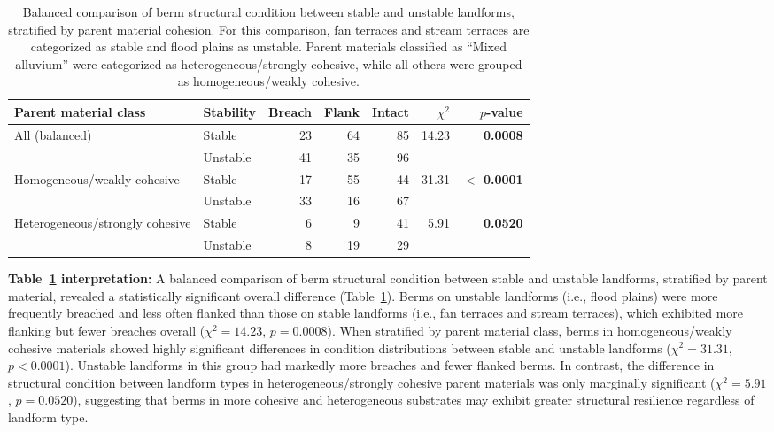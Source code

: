 \documentclass[review]{elsarticle}
\begin{document}
\begin{table}[h!]
\centering
\caption{\normalsize Balanced comparison of berm structural condition between stable and unstable landforms, stratified by parent material cohesion. For this comparison, fan terraces and stream terraces are categorized as stable and flood plains as unstable. Parent materials classified as ``Mixed alluvium'' were categorized as heterogeneous/strongly cohesive, while all others were grouped as homogeneous/weakly cohesive.}
\small
\begin{tabular}{|l|l|r|r|r|r|r|}
\hline
\textbf{Parent material class} & \textbf{Stability} & \textbf{Breach} & \textbf{Flank} & \textbf{Intact} & \textbf{$\chi^2$} & \textbf{$p$-value} \\
\hline
\multirow{2}{*}{All (balanced)} & Stable & 23 & 64 & 85 & \multirow{2}{*}{14.23} & \multirow{2}{*}{\textbf{0.0008}} \\
& Unstable & 41 & 35 & 96 & & \\
\hline
\multirow{2}{*}{Homogeneous/weakly cohesive} & Stable & 17 & 55 & 44 & \multirow{2}{*}{31.31} & \multirow{2}{*}{\textbf{$<$ 0.0001}} \\
& Unstable & 33 & 16 & 67 & & \\
\hline
\multirow{2}{*}{Heterogeneous/strongly cohesive} & Stable & 6 & 9 & 41 & \multirow{2}{*}{5.91} & \multirow{2}{*}{\textbf{0.0520}} \\
& Unstable & 8 & 19 & 29 & & \\
\hline
\end{tabular}
\label{tab:stability_parentmat_chi}
\end{table}

\textbf{Table~\ref{tab:stability_parentmat_chi} interpretation:} A balanced comparison of berm structural condition between stable and unstable landforms, stratified by parent material, revealed a statistically significant overall difference (Table~\ref{tab:stability_parentmat_chi}). Berms on unstable landforms (i.e., flood plains) were more frequently breached and less often flanked than those on stable landforms (i.e., fan terraces and stream terraces), which exhibited more flanking but fewer breaches overall ($\chi^2 = 14.23$, $p = 0.0008$). When stratified by parent material class, berms in homogeneous/weakly cohesive materials showed highly significant differences in condition distributions between stable and unstable landforms ($\chi^2 = 31.31$, $p < 0.0001$). Unstable landforms in this group had markedly more breaches and fewer flanked berms. In contrast, the difference in structural condition between landform types in heterogeneous/strongly cohesive parent materials was only marginally significant ($\chi^2 = 5.91$, $p = 0.0520$), suggesting that berms in more cohesive and heterogeneous substrates may exhibit greater structural resilience regardless of landform type.
\end{document}
